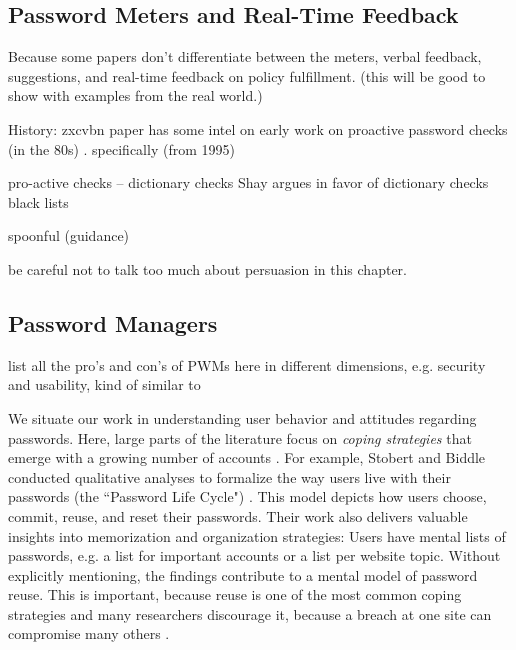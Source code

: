 	\cite{Shay2012CorrectHorseBatteryStaple}
	
	
	
	\subsection{Password Meters and Real-Time Feedback}
	
	 Because some papers don't differentiate between the meters, verbal feedback, suggestions, and real-time feedback on policy fulfillment. (this will be good to show with examples from the real world.)
	
	
	
	History: zxcvbn paper has some intel on early work on proactive password checks (in the 80s) \cite{Wheeler2016zxcvbn}. specifically (from 1995) \cite{Bishop1995ProactivePasswordChecking}
	
	
	pro-active checks -- dictionary checks Shay argues in favor of dictionary checks \cite{Shay2014CanLongPasswordsBeSecureAndUsable} 
	black lists \cite{Habib2017Blacklists} 
	
	spoonful (guidance) \cite{Shay2015SpoonfulOfSugar}
	\cite{Forget2008ImprovingPasswordsThroughPersuasion}
	
	be careful not to talk too much about persuasion in this chapter. 
	
	\subsection{Password Managers}
	
	list all the pro's and con's of PWMs here in different dimensions, e.g. security and usability, kind of similar to \cite{Bonneau2012ReplacePasswords}
	
	
	
	We situate our work in understanding user behavior and attitudes regarding passwords. Here, large parts of the literature focus on \textit{coping strategies} that emerge with a growing number of accounts \cite{Florencio2007LargeScaleStudyPasswordHabits, Florencio2014PasswordPortfoliosFiniteUser}. For example, Stobert and Biddle conducted qualitative analyses to formalize the way users live with their passwords (the ``Password Life Cycle") \cite{Stobert2014PasswordLifeCycle}. This model depicts how users choose, commit, reuse, and reset their passwords. Their work also delivers valuable insights into memorization and organization strategies: Users have mental lists of passwords, e.g. a list for important accounts or a list per website topic. Without explicitly mentioning, the findings contribute to a mental model of password reuse. This is important, because reuse is one of the most common coping strategies \cite{Das2014TangledWeb, Gaw2006PasswordManagement, Hayashi2011DiaryStudyPWs} and many researchers discourage it, because a breach at one site can compromise many others \cite{Bonneau2012ScienceOfGuessing, Komanduri2011OfPasswordsAndPeople}. 
	
